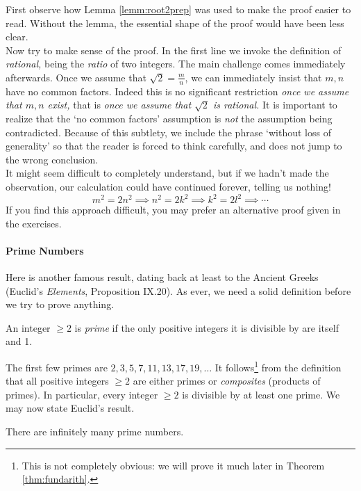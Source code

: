 \noindent First observe how Lemma \ref{lemm:root2prep} was used to make the proof easier to read. Without the lemma, the essential shape of the proof would have been less clear.\\
Now try to make sense of the proof. In the first line we invoke the definition of \emph{rational,} being the \emph{ratio} of two integers. The main challenge comes immediately afterwards. Once we assume that $\sqrt 2=\frac mn$, we can immediately insist that $m,n$ have no common factors. Indeed this is no significant restriction \emph{once we assume that $m,n$ exist,} that is \emph{once we assume that $\sqrt 2$ is rational.} It is important to realize that the `no common factors' assumption is \emph{not} the assumption being contradicted. Because of this subtlety, we include the phrase `without loss of generality' so that the reader is forced to think carefully, and does not jump to the wrong conclusion.\\
It might seem difficult to completely understand, but if we hadn't made the observation, our calculation could have continued forever, telling us nothing!
\[m^2=2n^2\implies n^2=2k^2\implies k^2=2l^2\implies\cdots\]
If you find this approach difficult, you may prefer an alternative proof given in the exercises.

\paragraph{Prime Numbers}

Here is another famous result, dating back at least to the Ancient Greeks (Euclid's \emph{Elements}, Proposition IX.20). As ever, we need a solid definition before we try to prove anything.

\begin{defn}\label{defn:irreducible}
An integer $\ge 2$ is \emph{prime} if the only positive integers it is divisible by are itself and 1.
\end{defn}

\noindent The first few primes are $2,3,5,7,11,13,17,19,\ldots$ It follows\footnote{This is not completely obvious: we will prove it much later in Theorem \ref{thm:fundarith}.} from the definition that all positive integers $\ge 2$ are either primes or \emph{composites} (products of primes). In particular, every integer $\ge 2$ is divisible by at least one prime. We may now state Euclid's result.

\begin{thm}
There are infinitely many prime numbers.
\end{thm}


